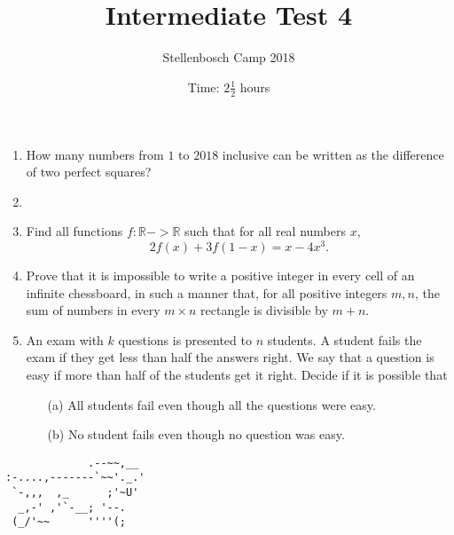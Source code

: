 \documentclass{article}
\title{Intermediate Test 4}
\author{Stellenbosch Camp 2018}
\date{Time: $2\frac{1}{2}$ hours}
\begin{document}
\maketitle

\begin{enumerate}[1.]

\item %
How many numbers from $1$ to $2018$ inclusive can be written as the difference of two perfect squares?


\vspace{12pt}
\item %


\vspace{12pt}
\item %
Find all functions $f : \mathbb{R} -> \mathbb{R}$ such that for all real numbers $x$, \[ 2 f(x) +3 f(1-x) = x-4x^3. \]


\vspace{12pt}
\item %
Prove that it is impossible to write a positive integer in every cell of an infinite chessboard, in such a manner that, for all positive integers $m, n$, the sum of numbers in every $m\times n$ rectangle is divisible by $m + n$.


\vspace{12pt}
\item %
An exam with $k$ questions is presented to $n$ students. A student fails the exam if they get less than half the answers right. We say that a question is easy if more than half of the students get it right. Decide if it is possible that

\begin{enumerate}
    \item[(a)]  All students fail even though all the questions were easy.
    \item[(b)] No student fails even though no question was easy.
\end{enumerate}


\end{enumerate}


\vfill
\centering
\begin{BVerbatim}
             .--~~,__
:-....,-------`~~'._.'
 `-,,,  ,_      ;'~U'
  _,-' ,'`-__; '--.
 (_/'~~      ''''(;
\end{BVerbatim}
\end{document}
